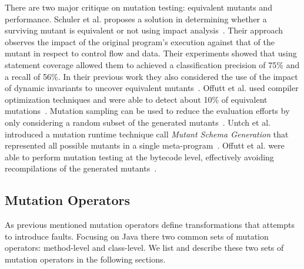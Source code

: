 There are two major critique on mutation testing: equivalent mutants and performance. Schuler et al. proposes a solution in determining whether a surviving mutant is equivalent or not using impact analysis~\cite{SZ10}. Their approach observes the impact of the original program's execution against that of the mutant in respect to control flow and data. Their experiments showed that using statement coverage allowed them to achieved a classification precision of 75\% and a recall of 56\%. In their previous work they also considered the use of the impact of dynamic invariants to uncover equivalent mutants~\cite{SDZ09}. Offutt et al. used compiler optimization techniques and were able to detect about 10\% of equivalent mutations~\cite{OC94}. Mutation sampling can be used to reduce the evaluation efforts by only considering a random subset of the generated mutants~\cite{Bud80}. Untch et al. introduced a mutation runtime technique call \emph{Mutant Schema Generation} that represented all possible mutants in a single meta-program~\cite{UOH93}. Offutt et al. were able to perform mutation testing at the bytecode level, effectively avoiding recompilations of the generated mutants~\cite{OMK04}.


\subsection{Mutation Operators}
\label{subsec:background_mutation_operators}
As previous mentioned mutation operators define transformations that attempts to introduce faults. Focusing on Java there two common sets of mutation operators: method-level and class-level. We list and describe these two sets of mutation operators in the following sections.


